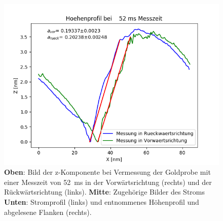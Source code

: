 \documentclass[12pt,a4paper]{article}
\begin{document}
\begin{figure}[H]
\includegraphics[scale=0.5]{Bilder/Anhang/Zeit/Profil_Zeit_52.png}
\caption{\textbf{Oben}: Bild der z-Komponente bei Vermessung der Goldprobe mit einer Messzeit von \SI{52}{ms} in der Vorwärtsrichtung (rechts) und der Rückwärtsrichtung (links). \textbf{Mitte}: Zugehörige Bilder des Stroms \textbf{Unten}: Stromprofil (links) und entnommenes Höhenprofil und abgelesene Flanken (rechts).}
\end{figure}
\end{document}
